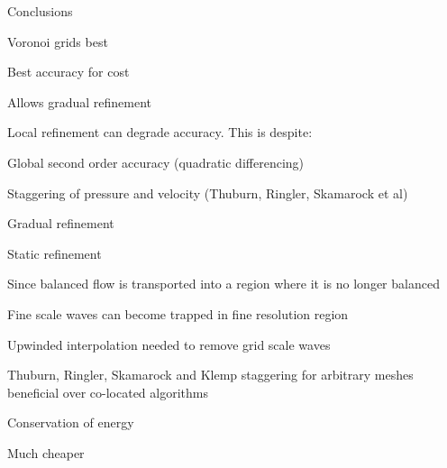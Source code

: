 \begin{slide}{Conclusions}
\large
\begin{list0}

\item Voronoi grids best
    \begin{list1}
    \item Best accuracy for cost
    \item Allows gradual refinement
    \end{list1}

\item Local refinement can degrade accuracy. This is despite:
    \begin{list1}
    \item Global second order accuracy (quadratic differencing)
    \item Staggering of pressure and velocity (Thuburn, Ringler, Skamarock et al)
    \item Gradual refinement
    \item Static refinement
    \item Since balanced flow is transported into a region where it is no longer balanced
    \item Fine scale waves can become trapped in fine resolution region
    \item Upwinded interpolation needed to remove grid scale waves
    \end{list1}

\item Thuburn, Ringler, Skamarock and Klemp staggering for arbitrary meshes beneficial over co-located algorithms
    \begin{list1}
    \item Conservation of energy
    \item Much cheaper
    \end{list1}

\end{list0}

\end{slide}
